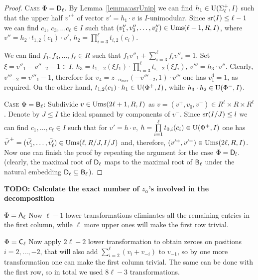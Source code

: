 \begin{proof}
\textsc{Case $\Phi=\mathsf{D}_\ell$.} 
By Lemma~\ref{lemma:asrUnip} we can find $h_1\in \operatorname{U}(\Sigma^+_\ell, I)$ such that the upper half $v'^+$ of vector $v'=h_1\cdot v$ is $I$-unimodular.
Since $\operatorname{sr}(I)\leq \ell-1$ we can find $c_1$, $c_3, \ldots c_\ell \in I$ such that $(v''_1, v''_3, \ldots, v''_\ell) \in \operatorname{Ums}(\ell-1, R, I)$, where
$v''=h_2 \cdot t_{1,2}(c_1) \cdot v'$, $h_2=\prod\limits_{i=3}^\ell t_{i,2}(c_i)$.

We can find $f_1, f_3,\ldots, f_\ell \in R$ such that $f_1v''_1+\sum\limits_{i=3}^\ell f_i v''_{i} = 1$.
Set $\xi = v''_1-v''_{-2}-1 \in I$, $h_3 = t_{1,-2}(\xi f_1) \cdot \prod\limits_{i=3}^\ell t_{i,-2}(\xi f_i)$, $v'''=h_3 \cdot v''$.
Clearly, $v'''_{-2}=v'''_1-1$, therefore for $v_4 = z_{-\alpha_{max}}(-v'''_{-2}, 1) \cdot v'''$ one has $v^4_1 = 1$, as required.
On the other hand, $t_{1,2}(c_1) \cdot h_1 \in \operatorname{U}(\Phi^+, I)$, while $ h_3 \cdot h_2 \in \operatorname{U}(\Phi^-, I)$.

\textsc{Case $\Phi=\mathsf{B}_\ell$:} Subdivide $v\in \operatorname{Ums}(2\ell+1, R, I)$ as $v=(v^+, v_0, v^-)\in R^\ell\times R\times R^\ell$.
Denote by $J\leq I$ the ideal spanned by components of $v^-$.
Since $\operatorname{sr}(I/J)\leq l$ we can find $c_1,\dots,c_\ell\in I$ such that for $v' = h \cdot v$, $h = \prod\limits_{i=1}^\ell t_{0, i}(c_i) \in \operatorname{U}(\Phi^+, I)$
one has $\bar{v'}^+=(\bar{v'_1},\ldots, \bar{v'_\ell}) \in \operatorname{Ums}(\ell, R/J, I/J)$ and, therefore, $(v'^+, v'^-) \in \operatorname{Ums}(2\ell, R, I)$.
Now one can finish the proof by repeating the argument for the case $\Phi=\mathsf{D}_l$.
(clearly, the maximal root of $\mathsf{D}_\ell$ maps to the maximal root of $\mathsf{B}_\ell$ under the natural embedding $\mathsf{D}_\ell\subseteq\mathsf{B}_\ell$). \end{proof}

\begin{rem} %
\textbf{TODO: Calculate the exact number of $z_\alpha$'s involved in the decomposition}

\textsc{$\Phi=\mathsf{A}_\ell$}
Now $\ell-1$ lower transformations eliminates all the remaining entries in the first column, while $\ell$ more upper ones will make the first row trivial.

\textsc{$\Phi=\mathsf{C}_\ell$}
Now apply $2\ell-2$ lower transformation to obtain zeroes on positions $i=2,\ldots,-2$, that will also add $\sum_{i=2}^\ell (v_i+v_{-i})$ to $v_{-1}$, 
so by one more transformation one can make the first column trivial. 
The same can be done with the first row, so in total we used $8\ell-3$ transformations.

\end{rem}
